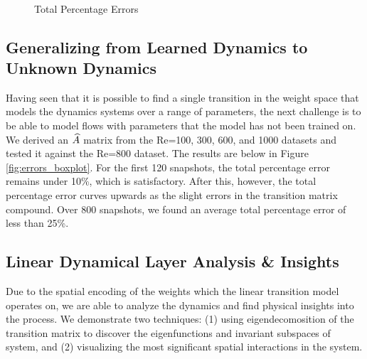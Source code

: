 \begin{figure*}[h] %
	\centering
	\\
	\caption{Total Percentage Errors}
\end{figure*}

\subsection{Generalizing from Learned Dynamics to Unknown Dynamics}\label{sec:generalize}

Having seen that it is possible to find a single transition in the weight space that models the dynamics systems over a range of parameters, the next challenge is to be able to model flows with parameters that the model has not been trained on. We derived an $\widehat{A}$ matrix from the Re=100, 300, 600, and 1000 datasets and tested it against the Re=800 dataset. The results are below in Figure \ref{fig:errors_boxplot}. For the first 120 snapshots, the total percentage error remains under 10\%, which is satisfactory. After this, however, the total percentage error curves upwards as the slight errors in the transition matrix compound. Over 800 snapshots, we found an average total percentage error of less than 25\%. %

\subsection{Linear Dynamical Layer Analysis \& Insights}\label{sec:analysis}
Due to the spatial encoding of the weights which the linear transition model operates on, we are able to analyze the dynamics and find physical insights into the process. We demonstrate two techniques: (1) using eigendecomosition of the transition matrix to discover the eigenfunctions and invariant subspaces of system, and (2) visualizing the most significant spatial interactions in the system.

